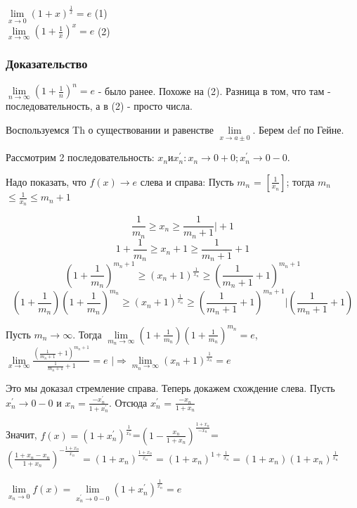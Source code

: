 	\opred
	$\lim\limits_{x\rightarrow 0}(1+x)^\frac{1}{x}=e$ (1)
	\\
	$\lim\limits_{x\rightarrow \infty}(1+\frac{1}{x})^x=e$ (2)
	\subsubsection{Доказательство}
	$\lim\limits_{n\rightarrow \infty}(1+\frac{1}{n})^n=e$ - было ранее. Похоже на (2).
	Разница в том, что там - последовательность, а в (2) - просто числа.

	Воспользуемся Th о существовании и равенстве $\lim\limits_{x\rightarrow a\pm 0}$. Берем def по Гейне.

	Рассмотрим 2 последовательность: $x_n и x_n^{'}: x_n \rightarrow 0 + 0; x_n^{'} \rightarrow 0-0$.

	Надо показать, что $f(x)\rightarrow e$ слева и справа:
	Пусть $m_n$ = $ [\frac{1}{x_n}]$; тогда $m_n$ $\leq \frac{1}{x_n} \leq m_n + 1$

	$$\frac{1}{m_n} \geq x_n \geq \frac{1}{m_n + 1} \bigg| +1$$
	$$ 1 + \frac{1}{m_n} \geq x_n + 1 \geq \frac{1}{m_n + 1} + 1$$
	$$\left(1 + \frac{1}{m_n}\right)^{m_n+1} \geq (x_n + 1)^{\frac{1}{x_n}} \geq \left(\frac{1}{m_n + 1} + 1\right)^{m_n+1}$$
	$$\left(1 + \frac{1}{m_n}\right)\left(1 + \frac{1}{m_n}\right)^{m_n} \geq (x_n + 1)^{\frac{1}{x_n}} \geq \left(\frac{1}{m_n + 1} + 1\right)^{m_n+1}
	\bigg| \left(\frac{1}{m_n + 1} + 1\right)$$

	Пусть $m_n \rightarrow \infty$.
	Тогда $\lim\limits_{m_n\rightarrow\infty}\left(1+\frac{1}{m_n}\right)\left(1+\frac{1}{m_n}\right)^{m_n}=e$,
	$\lim\limits_{x\rightarrow\infty}\frac{\left(\frac{1}{m_n + 1} + 1\right)^{m_n+1}}{\frac{1}{m_n + 1} + 1}=e$
	$\bigg| \Rightarrow \lim\limits_{m_n\rightarrow\infty}(x_n + 1)^{\frac{1}{x_n}}=e$

	Это мы доказал стремление справа. Теперь докажем схождение слева. Пусть $x_n^{'} \rightarrow 0-0$ и
	$x_n = \frac{-x_n^{'}}{1+x_n^{'}}$. Отсюда $x_n^{'}$ = $\frac{-x_n}{1+x_n}$

	Значит, $f(x)=(1+x_n^{'})^{\frac{1}{x_n^{'}}}$=$\left(1 - \frac{x_n}{1+x_n}\right)^\frac{1+x_n}{-x_n}$=
	$\left(\frac{1+x_n-x_n}{1+x_n}\right)^{-\frac{1+x_n}{x_n}}=(1+x_n)^{\frac{1+x_n}{x_n}}=
	(1+x_n)^{1+\frac{1}{x_n}}=(1+x_n)(1+x_n)^{\frac{1}{x_n}}$

	$\lim\limits_{x_n\rightarrow0}f(x)=\lim\limits_{x_n^{'}\rightarrow0-0}(1+x_n^{'})^{\frac{1}{x_n}}=e$



